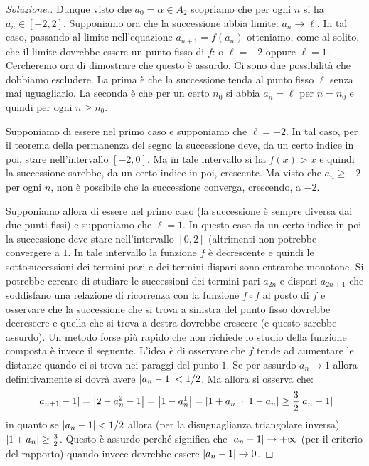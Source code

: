 \begin{proof}[Soluzione.]
  Dunque visto che $a_0 = \alpha \in A_2$ scopriamo che per ogni $n$
  si ha $a_n \in [-2,2]$. Supponiamo ora che la successione abbia
  limite: $a_n \to \ell$. In tal caso, passando al limite
  nell'equazione $a_{n+1} = f(a_n)$ otteniamo, come al solito, che il
  limite dovrebbe essere un punto fisso di $f$: o $\ell=-2$ oppure
  $\ell=1$. Cercheremo ora di dimostrare che questo è assurdo. Ci sono
  due possibilità che dobbiamo escludere. La prima è che la
  successione tenda al punto fisso $\ell$ senza mai uguagliarlo. La
  seconda è che per un certo $n_0$ si abbia $a_n = \ell$ per $n=n_0$ e
  quindi per ogni $n\ge n_0$.

  Supponiamo di essere nel primo caso e supponiamo che $\ell = -2$. In
  tal caso, per il teorema della permanenza del segno la successione
  deve, da un certo indice in poi, stare nell'intervallo $[-2, 0]$. Ma
  in tale intervallo si ha $f(x)>x$ e quindi la successione sarebbe,
  da un certo indice in poi, crescente. Ma visto che $a_n \ge -2$ per
  ogni $n$, non è possibile che la successione converga, crescendo, a
  $-2$.

  Supponiamo allora di essere nel primo caso (la successione è sempre
  diversa dai due punti fissi) e supponiamo che $\ell = 1$. In
  questo caso da un certo indice in poi la successione deve stare
  nell'intervallo $[0,2]$ (altrimenti non potrebbe convergere a
  $1$. In tale intervallo la funzione $f$ è decrescente e quindi
  le sottosuccessioni dei termini pari e dei termini dispari sono
  entrambe monotone. Si potrebbe cercare di studiare le successioni dei
  termini pari $a_{2n}$ e dispari $a_{2n+1}$ che soddisfano una relazione di ricorrenza
  con la funzione $f\circ f$ al posto di $f$ e osservare che la successione
  che si trova a sinistra del punto fisso dovrebbe decrescere e quella che si trova a
  destra dovrebbe crescere (e questo sarebbe assurdo). Un metodo forse più
  rapido che non richiede lo studio della funzione composta è invece il seguente.
  L'idea è di osservare che $f$ tende ad aumentare le distanze quando ci si trova
  nei paraggi del punto $1$. Se per assurdo $a_n\to 1$ allora definitivamente
  si dovrà avere ${\left|a_n-1\right|}< 1/2$. Ma allora si osserva che:
  \[
    {\left|a_{n+1}-1\right|}
    = {\left|2-a_n^2-1\right|}={\left|1-a_n^1\right|}
    = {\left|1+a_n\right|}\cdot {\left|1-a_n\right|}
    \ge \frac 3 2 {\left|a_n-1\right|}
  \]
  in quanto se ${\left|a_n-1\right|}<1/2$ allora (per la disuguaglianza triangolare inversa)
  ${\left|1+a_n\right|}\ge \frac 3 2$. Questo è assurdo perché significa che ${\left|a_n -1\right|}\to +\infty$
  (per il criterio del rapporto) quando invece dovrebbe essere ${\left|a_n-1\right|}\to 0$.


\end{proof}
